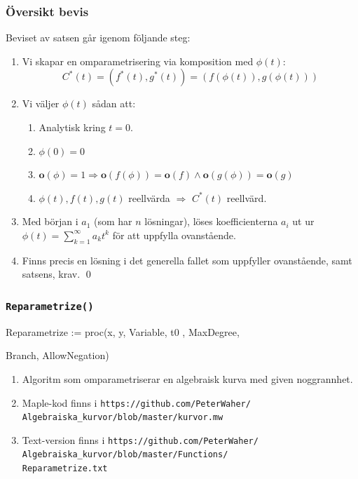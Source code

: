 \documentclass{beamer}
\begin{document}
\begin{frame}
	\frametitle{Översikt bevis}
	Beviset av satsen går igenom följande steg:
	
	\begin{enumerate}
		\item<1-> Vi skapar en omparametrisering via komposition med $\phi(t)$:
		\[C^*(t) = (f^*(t), g^*(t)) = (f(\phi(t)), g(\phi(t)))\]
		
		\item<2-> Vi väljer $\phi(t)$ sådan att:
		\begin{enumerate}
			\item<3-> Analytisk kring $t = 0$.
			
			\item<4-> $\phi(0)=0$
			
			\item<5-> $\mathbf{o}(\phi)=1 \Longrightarrow \mathbf{o}(f(\phi))=\mathbf{o}(f) \wedge \mathbf{o}(g(\phi))=\mathbf{o}(g)$
			
			\item<6-> $\phi(t), f(t), g(t)$ reellvärda $\Longrightarrow$ $C^*(t)$ reellvärd.
			
		\end{enumerate}
		
		\item<7-> Med början i $a_1$ (som har $n$ lösningar), löses koefficienterna $a_i$ ut ur $\phi(t)=\sum_{k=1}^{\infty}a_k t^k$ för att uppfylla ovanstående.
		
		\item<8-> Finns precis en lösning i det generella fallet som uppfyller ovanstående, samt satsens, krav.
		\qed
	\end{enumerate}
\end{frame}

\begin{frame}
	\frametitle{\texttt{Reparametrize()}}

\begin{semiverbatim}
Reparametrize := proc(x, y, Variable, t0 , MaxDegree,

\qquad Branch, AllowNegation)
\end{semiverbatim}
	
	\begin{enumerate}
		\item<1-> Algoritm som omparametriserar en algebraisk kurva med given noggrannhet.
		
		\item<2-> Maple-kod finns i \texttt{https://github.com/PeterWaher/\\
			\qquad Algebraiska\_kurvor/blob/master/kurvor.mw}
		
		\item<3-> Text-version finns i
		\texttt{https://github.com/PeterWaher/\\
			\qquad Algebraiska\_kurvor/blob/master/Functions/\\
			\qquad Reparametrize.txt} 
	\end{enumerate}
\end{frame}
\end{document}
